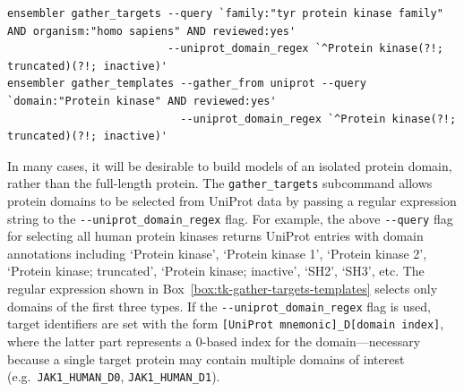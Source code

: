 \documentclass[10pt,letterpaper]{article}
\begin{document}
\begin{codebox}[h]
\begin{adjustwidth}{-2.25in}{0in}
\footnotesize
\begin{Verbatim}[frame=single]
ensembler gather_targets --query `family:"tyr protein kinase family" AND organism:"homo sapiens" AND reviewed:yes'
                         --uniprot_domain_regex `^Protein kinase(?!; truncated)(?!; inactive)'
ensembler gather_templates --gather_from uniprot --query `domain:"Protein kinase" AND reviewed:yes'
                           --uniprot_domain_regex `^Protein kinase(?!; truncated)(?!; inactive)'
\end{Verbatim}
\caption{{\bf Ensembler command-line functions used to select targets and templates.}
The commands retrieve target and template data by querying UniProt.
The query string provided to the {\tt gather\_targets} command selects all human tyrosine protein kinases which have been reviewed by a curator, while the query string provided to the {\tt gather\_templates} command selects all reviewed protein kinases of any species.
The {\tt-{}-uniprot\_domain\_regex} flag is used to select a subset of the domains belonging to the returned UniProt protein entries, by matching the domain annotations against a given regular expression.
In this example, domains of type `Protein kinase', `Protein kinase 1', and `Protein kinase 2' were selected, while excluding many other domain types such as `Protein kinase; truncated', `Protein kinase; inactive', `SH2', `SH3', etc.
Target selection simply entails the selection of sequences corresponding to each matching UniProt domain.
Template selection entails the selection of the sequences and structures of any PDB entries corresponding to the matching UniProt domains.
}
\label{box:tk-gather-targets-templates}
\end{adjustwidth}
\end{codebox}

In many cases, it will be desirable to build models of an isolated protein domain, rather than the full-length protein.
The {\tt gather\_targets} subcommand allows protein domains to be selected from UniProt data by passing a regular expression string to the {\tt -{}-uniprot\_domain\_regex} flag. 
For example, the above {\tt -{}-query} flag for selecting all human protein kinases returns UniProt entries with domain annotations including `Protein kinase', `Protein kinase 1', `Protein kinase 2', `Protein kinase; truncated', `Protein kinase; inactive', `SH2', `SH3', etc.
The regular expression shown in Box~\ref{box:tk-gather-targets-templates} selects only domains of the first three types.
If the {\tt -{}-uniprot\_domain\_regex} flag is used, target identifiers are set with the form {\tt [UniProt mnemonic]\_D[domain index]}, where the latter part represents a 0-based index for the domain---necessary because a single target protein may contain multiple domains of interest (e.g.~{\tt JAK1\_HUMAN\_D0}, {\tt JAK1\_HUMAN\_D1}).
\end{document}
